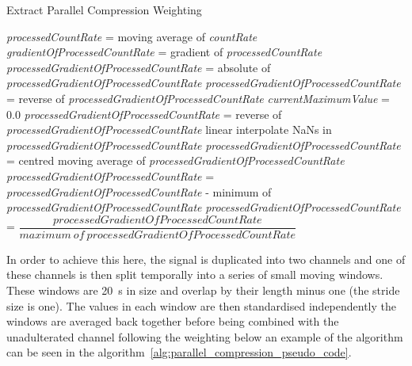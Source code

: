         \begin{algorithm} \label{alg:extract_parallel_compression_weighting_pseudo_code}
            \caption{Extract Parallel Compression Weighting}
            \;
            \textit{processedCountRate} = moving average of \textit{countRate}\;
            \;
            \textit{gradientOfProcessedCountRate} = gradient of \textit{processedCountRate}\;
            \;
            \textit{processedGradientOfProcessedCountRate} = absolute of \textit{processedGradientOfProcessedCountRate}\;
            \;
            \textit{processedGradientOfProcessedCountRate} = reverse of \textit{processedGradientOfProcessedCountRate}\;
            \textit{currentMaximumValue} = 0.0\;
            \;
            \;
            \textit{processedGradientOfProcessedCountRate} = reverse of \textit{processedGradientOfProcessedCountRate}\;
            linear interpolate \glspl{NaN} in \textit{processedGradientOfProcessedCountRate}\;
            \;
            \textit{processedGradientOfProcessedCountRate} = centred moving average of \textit{processedGradientOfProcessedCountRate}\;
            \;
            \textit{processedGradientOfProcessedCountRate} = \textit{processedGradientOfProcessedCountRate} - minimum of \textit{processedGradientOfProcessedCountRate}\;
            \textit{processedGradientOfProcessedCountRate} = $\dfrac{\textit{processedGradientOfProcessedCountRate}}{maximum\ of\ \textit{processedGradientOfProcessedCountRate}}$\;
        \end{algorithm}

        In order to achieve this here, the signal is duplicated into two channels and one of these channels is then split temporally into a series of small moving windows. These windows are \SI{20}{\second} in size and overlap by their length minus one (the stride size is one). The values in each window are then standardised independently the windows are averaged back together before being combined with the unadulterated channel following the weighting below an example of the algorithm can be seen in the algorithm~\ref{alg:parallel_compression_pseudo_code}.
        
